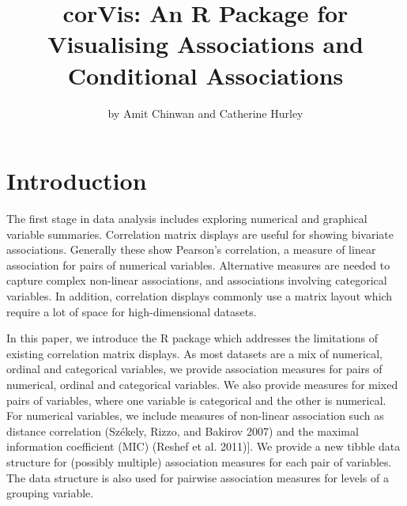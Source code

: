 \title{corVis: An R Package for Visualising Associations and Conditional Associations}
\author{by Amit Chinwan and Catherine Hurley}

\maketitle


\hypertarget{introduction}{%
\section{Introduction}\label{introduction}}

The first stage in data analysis includes exploring numerical and graphical variable summaries.
Correlation matrix displays are useful for showing bivariate associations. Generally these show Pearson's correlation, a measure of linear association for pairs of numerical variables. Alternative measures are needed to capture complex non-linear associations, and associations involving categorical variables.
In addition, correlation displays commonly use a matrix layout which require a lot of space for high-dimensional datasets.

In this paper, we introduce the R package  which addresses the limitations of existing correlation matrix displays.
As most datasets are a mix of numerical, ordinal and categorical variables,
we provide association measures for pairs of numerical, ordinal and categorical variables. We also provide measures for mixed pairs of variables, where one variable is categorical and the other is numerical.
For numerical variables, we include measures of non-linear association such as distance correlation (Székely, Rizzo, and Bakirov 2007) and the maximal information coefficient (MIC) (Reshef et al. 2011){]}.
We provide a new tibble data structure for (possibly multiple) association measures for each pair of variables. The data structure is also used for pairwise association measures for levels of a grouping variable.

